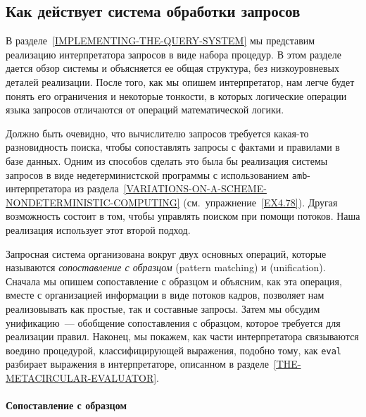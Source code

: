 \subsection{Как действует система обработки запросов}
\label{HOW-THE-QUERY-SYSTEM-WORKS}%

В 
разделе~\ref{IMPLEMENTING-THE-QUERY-SYSTEM}
мы представим реализацию интерпретатора запросов в виде набора
процедур.  В этом разделе дается обзор системы и объясняется ее общая
структура, без низкоуровневых деталей реализации.  После
того, как мы опишем интерпретатор, нам легче будет понять его
ограничения и некоторые тонкости, в которых логические операции языка
запросов отличаются от операций математической логики.

Должно быть очевидно, что вычислителю запросов требуется
какая-то разновидность поиска, чтобы сопоставлять запросы
с фактами и правилами в базе данных. Одним из способов сделать это
была бы реализация системы запросов в виде недетерминистской программы
с использованием {\tt amb}-интерпретатора из 
раздела~\ref{VARIATIONS-ON-A-SCHEME-NONDETERMINISTIC-COMPUTING}
(см.~упражнение~\ref{EX4.78}).  Другая возможность состоит
в том, чтобы управлять поиском при помощи потоков.  Наша реализация
использует этот второй подход.

Запросная система организована вокруг двух основных
операций, которые называются  {\em сопоставление с образцом} 
(pattern matching) и 
 (unification).  Сначала мы опишем
сопоставление с образцом и объясним, как эта операция, вместе с
организацией информации в виде потоков кадров, позволяет нам
реализовывать как простые, так и составные запросы.  Затем мы
обсудим унификацию~--- обобщение сопоставления с образцом, которое
требуется для реализации правил.  Наконец, мы покажем, как
части интерпретатора связываются воедино процедурой, 
классифицирующей выражения, подобно тому, как  {\tt eval}
разбирает выражения в интерпретаторе, описанном в 
разделе~\ref{THE-METACIRCULAR-EVALUATOR}.

\paragraph{Сопоставление с образцом}

